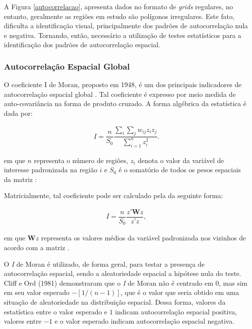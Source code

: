 \documentclass[12pt, a4paper,brazil,oneside]{article}
\begin{document}
	A Figura \ref{autocorrelacao}, apresenta dados no formato de \textit{grids} regulares, no entanto, geralmente as regiões em estudo são polígonos irregulares. Este fato, dificulta a identificação visual, principalmente dos padrões de autocorrelação nula e negativa. Tornando, então,	 necessário a utilização de testes estatísticos para a identificação dos padrões de autocorrelação espacial. 
	
	\subsubsection{Autocorrelação Espacial Global}
	
	O coeficiente I de Moran, proposto em 1948, é um dos principais indicadores de autocorrelação espacial global \cite{almeida12}. Tal coeficiente é expresso por meio medida de auto-covariância na forma de produto cruzado. A forma algébrica da estatística é dada por:
	
	\begin{align}
	\label{IMoran}
	I = \dfrac{n}{S_0} \dfrac{\sum_{i} \sum_{j} w_{ij} z_i z_j}{\sum_{i=1}^{n} z_i^2}.
	\end{align}
	
	\noindent em que $n$ representa o número de regiões, $z_i$ denota o valor da variável de interesse padronizada na região $i$ e $S_0$ é  o somatório de todos os pesos espaciais da matriz  \cite{almeida12}:
	
	Matricialmente, tal coeficiente pode ser calculado pela da seguinte forma:
	
	\begin{align*}
	I = \dfrac{n}{S_0} \dfrac{z'\boldsymbol{W}z}{z'z},
	\end{align*}
	
	\noindent em que $\boldsymbol{W}z$ representa os valores médios da variável padronizada nos vizinhos de acordo com a matriz .
	
	O \textit{I} de Moran é utilizado, de forma geral, para testar a presença de autocorrelação espacial, sendo a aleatoriedade espacial a hipótese nula do teste. Cliff e Ord (1981) demonstraram que o \textit{I} de Moran não é centrado em $0$, mas sim em seu valor esperado $-[1/(n-1)]$, que é o valor que seria obtido em uma situação de aleatoriedade na distribuição espacial. Dessa forma, valores da estatística entre o valor esperado e $1$ indicam autocorrelação espacial positiva, valores entre $-1$ e o valor esperado indicam autocorrelação espacial negativa. 
	
\end{document}
